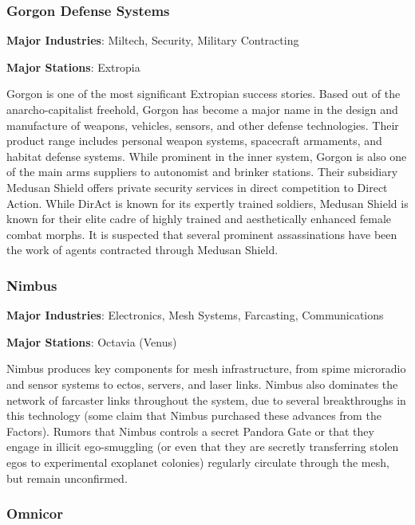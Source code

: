 \subsubsection{Gorgon Defense Systems}
\label{sec:gorg-defense-syst}

\textbf{Major Industries}: Miltech, Security, Military Contracting

\textbf{Major Stations}: Extropia


Gorgon is one of the most significant Extropian success stories. Based
out of the anarcho-capitalist freehold, Gorgon has become a major name
in the design and manufacture of weapons, vehicles, sensors, and other
defense technologies. Their product range includes personal weapon
systems, spacecraft armaments, and habitat defense systems. While
prominent in the inner system, Gorgon is also one of the main arms
suppliers to autonomist and brinker stations.  Their subsidiary
Medusan Shield offers private security services in direct competition
to Direct Action.  While DirAct is known for its expertly trained
soldiers, Medusan Shield is known for their elite cadre of highly
trained and aesthetically enhanced female combat morphs. It is
suspected that several prominent assassinations have been the work of
agents contracted through Medusan Shield.

\subsubsection{Nimbus}
\label{sec:nimbus}

\textbf{Major Industries}: Electronics, Mesh Systems, Farcasting, Communications

\textbf{Major Stations}: Octavia (Venus)


Nimbus produces key components for mesh infrastructure, from spime
microradio and sensor systems to ectos, servers, and laser
links. Nimbus also dominates the network of farcaster links throughout
the system, due to several breakthroughs in this technology (some
claim that Nimbus purchased these advances from the Factors). Rumors
that Nimbus controls a secret Pandora Gate or that they engage in
illicit ego-smuggling (or even that they are secretly transferring
stolen egos to experimental exoplanet colonies) regularly circulate
through the mesh, but remain unconfirmed.

\subsubsection{Omnicor}
\label{sec:omnicor}

